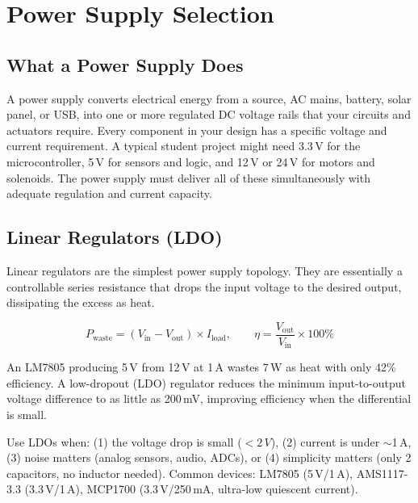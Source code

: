 \documentclass[11pt,letterpaper,twoside,openany]{book}
\begin{document}
\vspace{1em}




\vspace{1em}

\section{Power Supply Selection}

\subsection{What a Power Supply Does}

A power supply converts electrical energy from a source, AC mains, battery, solar panel, or USB, into one or more regulated DC voltage rails that your circuits and actuators require. Every component in your design has a specific voltage and current requirement. A typical student project might need 3.3\,V for the microcontroller, 5\,V for sensors and logic, and 12\,V or 24\,V for motors and solenoids. The power supply must deliver all of these simultaneously with adequate regulation and current capacity.

\subsection{Linear Regulators (LDO)}

Linear regulators are the simplest power supply topology. They are essentially a controllable series resistance that drops the input voltage to the desired output, dissipating the excess as heat.

\begin{equation}
  P_{\text{waste}} = (V_{\text{in}} - V_{\text{out}}) \times I_{\text{load}}, \qquad \eta = \frac{V_{\text{out}}}{V_{\text{in}}} \times 100\%
\end{equation}

An LM7805 producing 5\,V from 12\,V at 1\,A wastes 7\,W as heat with only 42\% efficiency. A low-dropout (LDO) regulator reduces the minimum input-to-output voltage difference to as little as 200\,mV, improving efficiency when the differential is small.

\begin{tipbox}
Use LDOs when: (1) the voltage drop is small ($<2\,V$), (2) current is under $\sim$1\,A, (3) noise matters (analog sensors, audio, ADCs), or (4) simplicity matters (only 2 capacitors, no inductor needed). Common devices: LM7805 (5\,V/1\,A), AMS1117-3.3 (3.3\,V/1\,A), MCP1700 (3.3\,V/250\,mA, ultra-low quiescent current).
\end{tipbox}
\end{document}
